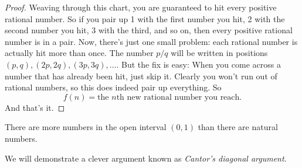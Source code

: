 \documentclass[11pt,twoside=off,numbers=noenddot]{scrbook}
\begin{document}
\begin{proof}
  Weaving through this chart, you are guaranteed to hit every
  positive rational number. So if you pair up 1 with the first number
  you hit, 2 with the second number you hit, 3 with the third, and so
  on, then every positive rational number is in a pair. Now, there's
  just one small problem: each rational number is actually hit more
  than once. The number $p/q$ will be written in positions $(p, q),
  (2p, 2q), (3p, 3q), \dots$. But the fix is easy: When you come
  across a number that has already been hit, just skip it. Clearly
  you won't run out of rational numbers, so this does indeed pair up
  everything. So
  \[ f(n) = \text{the $n$th new rational number you reach}. \]
  And that's it.
\end{proof}

\begin{theorem}
  There are more numbers in the open interval $(0, 1)$ than there are
  natural numbers.
\end{theorem}

We will demonstrate a clever argument known as \textit{Cantor's
diagonal argument}.
\end{document}
